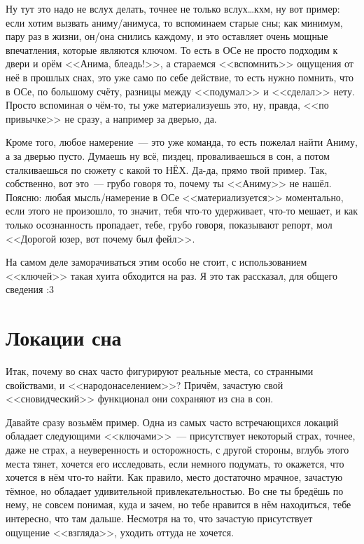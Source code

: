 \documentclass[a5paper,12pt,twoside]{memoir}
\begin{document}
\medskip
Ну тут это надо не вслух делать, точнее не только вслух\ldots кхм, ну вот пример: если хотим вызвать аниму/анимуса, то вспоминаем старые сны; как минимум, пару раз в жизни, он/она снились каждому, и это оставляет очень мощные впечатления, которые являются ключом. То есть в ОСе не просто подходим к двери и орём <<Анима, блеадь!>>, а стараемся <<вспомнить>> ощущения от неё в прошлых снах, это уже само по себе действие, то есть нужно помнить, что в ОСе, по большому счёту, разницы между <<подумал>> и <<сделал>> нету. Просто вспоминая о чём-то, ты уже материализуешь это, ну, правда, <<по привычке>> не сразу, а например за дверью, да. 

Кроме того, любое намерение~--- это уже команда, то есть пожелал найти Аниму, а за дверью пусто. Думаешь ну всё, пиздец, проваливаешься в сон, а потом сталкиваешься по сюжету с какой то НЁХ. Да-да, прямо твой пример. Так, собственно, вот это~--- грубо говоря то, почему ты <<Аниму>> не нашёл. Поясню: любая мысль/намерение в ОСе <<материализуется>> моментально, если этого не произошло, то значит, тебя что-то удерживает, что-то мешает, и как только осознанность пропадает, тебе, грубо говоря, показывают репорт, мол <<Дорогой юзер, вот почему был фейл>>. 

На самом деле заморачиваться этим особо не стоит, с использованием <<ключей>> такая хуита обходится на раз. Я это так рассказал, для общего сведения :3




\chapter{Локации сна}

Итак, почему во снах часто фигурируют реальные места, со странными свойствами, и <<народонаселением>>? Причём, зачастую свой <<сновидческий>> функционал они сохраняют из сна в сон.

Давайте сразу возьмём пример. Одна из самых часто встречающихся локаций обладает следующими <<ключами>>~--- присутствует некоторый страх, точнее, даже не страх, а неуверенность и осторожность, с другой стороны, вглубь этого места тянет, хочется его исследовать, если немного подумать, то окажется, что хочется в нём что-то найти. Как правило, место достаточно мрачное, зачастую тёмное, но обладает удивительной привлекательностью. Во сне ты бредёшь по нему, не совсем понимая, куда и зачем, но тебе нравится в нём находиться, тебе интересно, что там дальше. Несмотря на то, что зачастую присутствует ощущение <<взгляда>>, уходить оттуда не хочется. 
\end{document}
